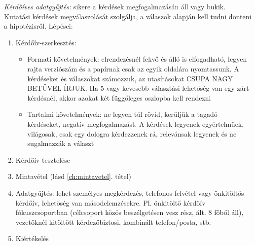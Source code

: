 \emph{Kérdőíves adatgyűjtés:} sikere a kérdések megfogalmazásán áll vagy bukik. Kutatási kérdések megválaszolását szolgálja, a válaszok alapján kell tudni dönteni a hipotézisről. Lépései:
\begin{enumerate}
\item Kérdőív-szerkesztés:
	\begin{itemize}
	\item Formati követelmények: elrendezésnél fekvő és álló is elfogadható, legyen rajta verziószám és a papírnak csak az egyik oldalára nyomtassunk. A kérdéseket és válaszokat számozzuk, az utasításokat CSUPA NAGY BETŰVEL ÍRJUK. Ha 5 vagy kevesebb választási lehetőség van egy zárt kérdésnél, akkor azokat két függőleges oszlopba kell rendezni
	\item Tartalmi követelmények: ne legyen túl rövid, kerüljük a tagadó kérdéseket, negatív megfogalmazást. A kérdések legyenek egyértelműek, világosak, csak egy dologra kérdezzenek rá, relevánsak legyenek és ne sugalmazzák a választ
	\end{itemize}
\item Kérdőív tesztelése
\item Mintavétel (lásd \ref{ch:mintavetel}. tétel)
\item Adatgyűjtés: lehet személyes megkérdezés, telefonos felvétel vagy önkitöltős kérdőív, lehetőség van másodelemzésekre. Pl. önkitöltő kérdőív fókuszcsoportban (célcsoport közös beszélgetésen vesz rész, ált. 8 főből áll), vezetőknél kitöltött kérdezőbiztosi, kombinált telefon/posta, stb.
\item Kiértékelés
\end{enumerate}
